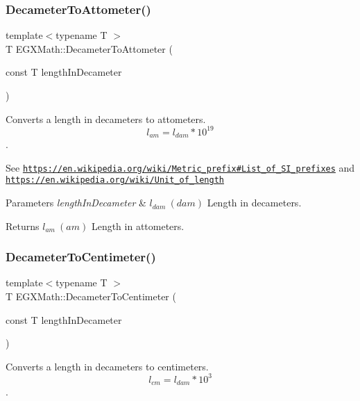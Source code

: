 \subsubsection{\texorpdfstring{Decameter\+To\+Attometer()}{DecameterToAttometer()}}
{\footnotesize\ttfamily template$<$typename T $>$ \\
T E\+G\+X\+Math\+::\+Decameter\+To\+Attometer (\begin{DoxyParamCaption}\item[{const T}]{length\+In\+Decameter }\end{DoxyParamCaption})}



Converts a length in decameters to attometers. \[ l_{am}=l_{dam} * 10^{19} \]. 

See \href{https://en.wikipedia.org/wiki/Metric_prefix#List_of_SI_prefixes}{\tt https\+://en.\+wikipedia.\+org/wiki/\+Metric\+\_\+prefix\#\+List\+\_\+of\+\_\+\+S\+I\+\_\+prefixes} and \href{https://en.wikipedia.org/wiki/Unit_of_length}{\tt https\+://en.\+wikipedia.\+org/wiki/\+Unit\+\_\+of\+\_\+length} 
\begin{DoxyParams}{Parameters}
{\em length\+In\+Decameter} & $ l_{dam}\ (dam)$ Length in decameters. \\
\hline
\end{DoxyParams}
\begin{DoxyReturn}{Returns}
$ l_{am}\ (am)$ Length in attometers. 
\end{DoxyReturn}
\mbox{\label{group___e_g_x_math-_conversions-_length_conversions-_decameter-_s_i_gab715f0e130e7886966146153786abc5d}} 
\subsubsection{\texorpdfstring{Decameter\+To\+Centimeter()}{DecameterToCentimeter()}}
{\footnotesize\ttfamily template$<$typename T $>$ \\
T E\+G\+X\+Math\+::\+Decameter\+To\+Centimeter (\begin{DoxyParamCaption}\item[{const T}]{length\+In\+Decameter }\end{DoxyParamCaption})}



Converts a length in decameters to centimeters. \[ l_{cm}=l_{dam} * 10^{3} \]. 

